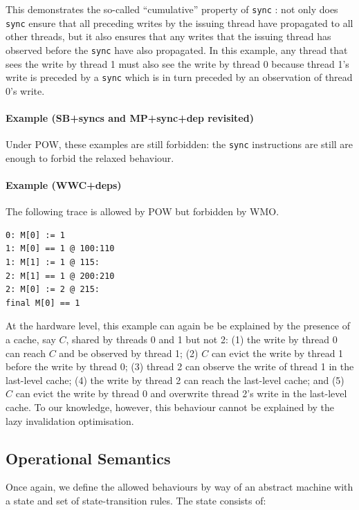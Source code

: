 \documentclass[11pt]{article}
\begin{document}
\noindent This demonstrates the so-called ``cumulative'' property of
\verb!sync! \cite{POWER}: not only does \verb!sync! ensure that all
preceding writes by the issuing thread have propagated to all other
threads, but it also ensures that any writes that the issuing thread
has observed before the \verb!sync! have also propagated.  In this
example, any thread that sees the write by thread 1 must also see the
write by thread 0 because thread 1's write is preceded by a
\verb'sync' which is in turn preceded by an observation of thread 0's
write.

\paragraph{Example (SB+syncs and MP+sync+dep revisited)} Under POW,
these examples are still forbidden: the \verb!sync! instructions are
still are enough to forbid the relaxed behaviour.

\paragraph{Example (WWC+deps)} The following trace is allowed by POW
but forbidden by WMO.

\begin{verbatim}
0: M[0] := 1
1: M[0] == 1 @ 100:110
1: M[1] := 1 @ 115:
2: M[1] == 1 @ 200:210
2: M[0] := 2 @ 215:
final M[0] == 1
\end{verbatim}

\noindent At the hardware level, this example can again be be
explained by the presence of a cache, say $C$, shared by threads 0 and
1 but not 2: (1) the write by thread 0 can reach $C$ and be
observed by thread 1; (2) $C$ can evict the write by thread 1 before
the write by thread 0; (3) thread 2 can observe the write of thread 1
in the last-level cache; (4) the write by thread 2 can reach the
last-level cache; and (5) $C$ can evict the write by thread 0 and
overwrite thread 2's write in the last-level cache.  To our knowledge,
however, this behaviour cannot be explained by the lazy invalidation
optimisation.

\subsection*{Operational Semantics}

Once again, we define the allowed behaviours by way of an abstract
machine with a state and set of state-transition rules.  The state
consists of:
\end{document}
